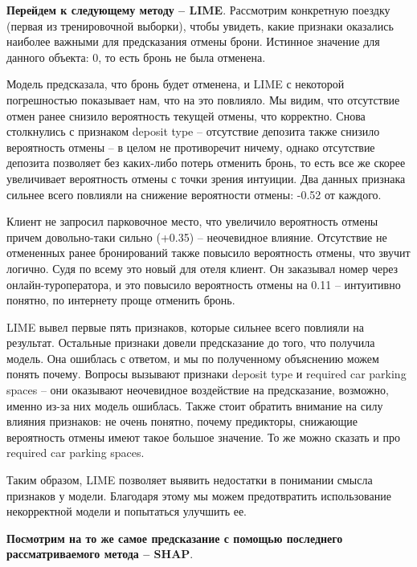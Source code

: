 \textbf{Перейдем к следующему методу -- LIME}. Рассмотрим конкретную поездку (первая из тренировочной выборки), чтобы увидеть, какие признаки оказались наиболее важными для предсказания отмены брони. Истинное значение для данного объекта: 0, то есть бронь не была отменена. 

\begin{figure}[h]
\end{figure}

Модель предсказала, что бронь будет отменена, и LIME с некоторой погрешностью показывает нам, что на это повлияло. Мы видим, что отсутствие отмен ранее снизило вероятность текущей отмены, что корректно. Снова столкнулись с признаком deposit type -- отсутствие депозита также снизило вероятность отмены -- в целом не противоречит ничему, однако отсутствие депозита позволяет без каких-либо потерь отменить бронь, то есть все же скорее увеличивает вероятность отмены с точки зрения интуиции. Два данных признака сильнее всего повлияли на снижение вероятности отмены: -0.52 от каждого.

Клиент не запросил парковочное место, что увеличило вероятность отмены причем довольно-таки сильно (+0.35) -- неочевидное влияние. Отсутствие не отмененных ранее бронирований также повысило вероятность отмены, что звучит логично. Судя по всему это новый для отеля клиент. Он заказывал номер через онлайн-туроператора, и это повысило вероятность отмены на 0.11 -- интуитивно понятно, по интернету проще отменить бронь.

LIME вывел первые пять признаков, которые сильнее всего повлияли на результат. Остальные признаки довели предсказание до того, что получила модель. Она ошиблась с ответом, и мы по полученному объяснению можем понять почему. Вопросы вызывают признаки deposit type и required car parking spaces -- они оказывают неочевидное воздействие на предсказание, возможно, именно из-за них модель ошиблась. Также стоит обратить внимание на силу влияния признаков: не очень понятно, почему предикторы, снижающие вероятность отмены имеют такое большое значение. То же можно сказать и про required car parking spaces.

Таким образом, LIME позволяет выявить недостатки в понимании смысла признаков у модели. Благодаря этому мы можем предотвратить использование некорректной модели и попытаться улучшить ее.

\textbf{Посмотрим на то же самое предсказание с помощью последнего рассматриваемого метода -- SHAP}.